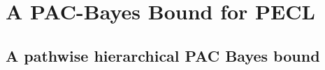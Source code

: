 \documentclass{article}
\theoremstyle{plain}
\theoremstyle{definition}
\theoremstyle{remark}
\begin{document}



\section{A PAC-Bayes Bound for PECL}
\label{sec:pac-pecl}
















\subsection{A pathwise hierarchical PAC Bayes bound}
\end{document}
